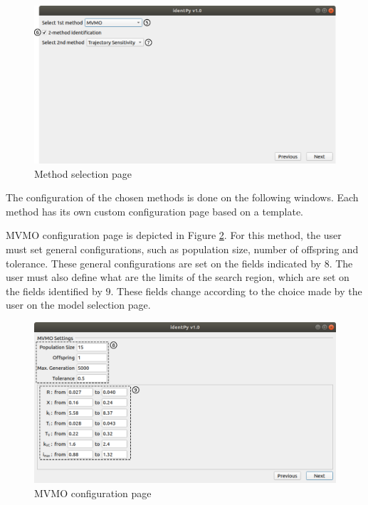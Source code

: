 \begin{figure}[!h]
	\caption{Method selection page}
	\begin{center}
		\includegraphics[scale=.5]{Images/Software_method_page.eps}
	\end{center}
	\label{fig: method_selection}
\end{figure}

The configuration of the chosen methods is done on the following windows. Each method has its own custom configuration page based on a template.

MVMO configuration page is depicted in Figure \ref{fig: MVMO_page}. For this method, the user must set general configurations, such as population size, number of offspring and tolerance. These general configurations are set on the fields indicated by $8$. The user must also define what are the limits of the search region, which are set on the fields identified by $9$. These fields change according to the choice made by the user on the model selection page.

\begin{figure}[!h]
	\caption{MVMO configuration page}
	\begin{center}
		\includegraphics[scale=.5]{Images/Software_MVMO_page.eps}
	\end{center}
	\label{fig: MVMO_page}
\end{figure}


